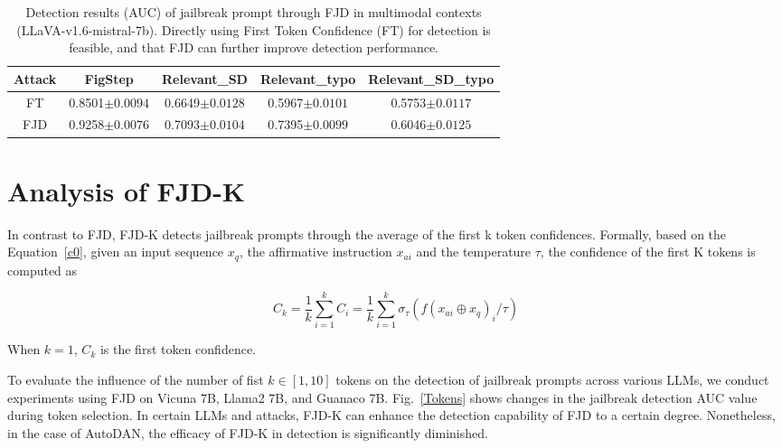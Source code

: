 \documentclass{article}
\begin{document}
\begin{table}[t]
    \centering
    \footnotesize
    \setlength\tabcolsep{21pt}
    \caption{Detection results (AUC) of jailbreak prompt through FJD in multimodal contexts (LLaVA-v1.6-mistral-7b). Directly using First Token Confidence (FT) for detection is feasible, and that FJD can further improve detection performance.}
    \begin{tabular}{ccccc}
    \toprule
        \textbf{Attack} & \textbf{FigStep} & \textbf{Relevant\_SD} & \textbf{Relevant\_typo} & \textbf{Relevant\_SD\_typo}  \\ 
        \midrule
        FT  & 0.8501\tiny{$\pm 0.0094$} & 0.6649\tiny{$\pm 0.0128$} & 0.5967\tiny{$\pm 0.0101$} & 0.5753\tiny{$\pm 0.0117$} \\ 
        FJD & 0.9258\tiny{$\pm 0.0076$} & 0.7093\tiny{$\pm 0.0104$} & 0.7395\tiny{$\pm 0.0099$} & 0.6046\tiny{$\pm 0.0125$}  \\ 
    \bottomrule
    \end{tabular}
    \label{multimodal-table}
\end{table}

\section{Analysis of FJD-K}\label{app:numk}

In contrast to FJD, FJD-K detects jailbreak prompts through the average of the first k token confidences. Formally, based on the Equation~\ref{c0}, given an input sequence $ x_q $, the affirmative instruction $x_{ai}$ and the temperature $\tau$, the confidence of the first K tokens is computed as 

\begin{equation}
    C_k=\frac{1}{k}\sum_{i=1}^{k} C_i=\frac{1}{k}\sum_{i=1}^{k} \sigma_\tau(f(x_{ai}\oplus x_q)_{i}/\tau)
\end{equation}

When $k=1$, $C_k$ is the first token confidence.

To evaluate the influence of the number of fist $k \in [1, 10]$ tokens on the detection of jailbreak prompts across various LLMs, we conduct experiments using FJD on Vicuna 7B, Llama2 7B, and Guanaco 7B. Fig.~\ref{Tokens} shows changes in the jailbreak detection AUC value during token selection. In certain LLMs and attacks, FJD-K can enhance the detection capability of FJD to a certain degree. Nonetheless, in the case of AutoDAN, the efficacy of FJD-K in detection is significantly diminished.
\end{document}
